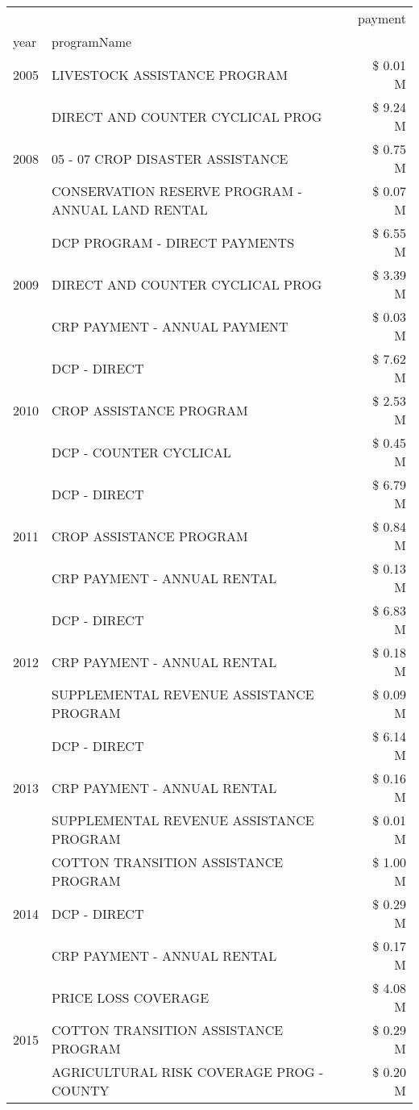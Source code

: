 \begin{tabular}{llr}
\toprule
 &  & payment \\
year & programName &  \\
\midrule
2005 & LIVESTOCK ASSISTANCE PROGRAM & \$ 0.01 M \\
\cline{1-3}
\multirow[t]{3}{*}{2008} & DIRECT AND COUNTER CYCLICAL PROG & \$ 9.24 M \\
 & 05 - 07 CROP DISASTER ASSISTANCE & \$ 0.75 M \\
 & CONSERVATION RESERVE PROGRAM - ANNUAL LAND RENTAL & \$ 0.07 M \\
\cline{1-3}
\multirow[t]{3}{*}{2009} & DCP PROGRAM - DIRECT PAYMENTS & \$ 6.55 M \\
 & DIRECT AND COUNTER CYCLICAL PROG & \$ 3.39 M \\
 & CRP PAYMENT - ANNUAL PAYMENT & \$ 0.03 M \\
\cline{1-3}
\multirow[t]{3}{*}{2010} & DCP - DIRECT & \$ 7.62 M \\
 & CROP ASSISTANCE PROGRAM & \$ 2.53 M \\
 & DCP - COUNTER CYCLICAL & \$ 0.45 M \\
\cline{1-3}
\multirow[t]{3}{*}{2011} & DCP - DIRECT & \$ 6.79 M \\
 & CROP ASSISTANCE PROGRAM & \$ 0.84 M \\
 & CRP PAYMENT - ANNUAL RENTAL & \$ 0.13 M \\
\cline{1-3}
\multirow[t]{3}{*}{2012} & DCP - DIRECT & \$ 6.83 M \\
 & CRP PAYMENT - ANNUAL RENTAL & \$ 0.18 M \\
 & SUPPLEMENTAL REVENUE ASSISTANCE PROGRAM & \$ 0.09 M \\
\cline{1-3}
\multirow[t]{3}{*}{2013} & DCP - DIRECT & \$ 6.14 M \\
 & CRP PAYMENT - ANNUAL RENTAL & \$ 0.16 M \\
 & SUPPLEMENTAL REVENUE ASSISTANCE PROGRAM & \$ 0.01 M \\
\cline{1-3}
\multirow[t]{3}{*}{2014} & COTTON TRANSITION ASSISTANCE PROGRAM & \$ 1.00 M \\
 & DCP - DIRECT & \$ 0.29 M \\
 & CRP PAYMENT - ANNUAL RENTAL & \$ 0.17 M \\
\cline{1-3}
\multirow[t]{3}{*}{2015} & PRICE LOSS COVERAGE & \$ 4.08 M \\
 & COTTON TRANSITION ASSISTANCE PROGRAM & \$ 0.29 M \\
 & AGRICULTURAL RISK COVERAGE PROG - COUNTY & \$ 0.20 M \\

\end{tabular}
